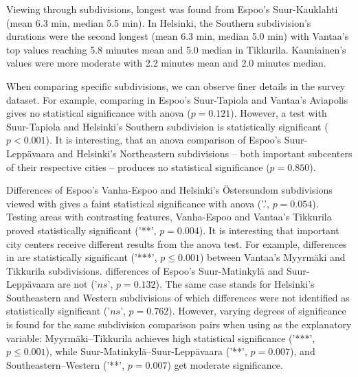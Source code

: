 Viewing  through subdivisions, longest  was found from Espoo's Suur-Kauklahti (mean 6.3 min, median 5.5 min). In Helsinki, the Southern subdivision's durations were the second longest (mean 6.3 min, median 5.0 min) with Vantaa's top values reaching 5.8 minutes mean and 5.0 median in Tikkurila. Kauniainen's  values were more moderate with 2.2 minutes mean and 2.0 minutes median.

When comparing specific subdivisions, we can observe finer details in the survey dataset. For example, comparing  in Espoo's Suur-Tapiola and Vantaa's Aviapolis gives no statistical significance with \acrshort{anova} ($p = 0.121$). However, a test with Suur-Tapiola and Helsinki's Southern subdivision is statistically significant ($p < 0.001$). It is interesting, that an \acrshort{anova}  comparison of Espoo's Suur-Leppävaara and Helsinki's Northeastern subdivisions -- both important subcenters of their respective cities -- produces no statistical significance ($p = 0.850$). 

Differences of Espoo's Vanha-Espoo and Helsinki's Östersundom subdivisions viewed with  gives a faint statistical significance with \acrshort{anova} ('.', $p = 0.054$). Testing areas with contrasting features, Vanha-Espoo and Vantaa's Tikkurila proved statistically significant ('**', $p = 0.004$). It is interesting that important city centers receive different results from the \acrshort{anova} test. For example, differences in  are statistically significant (’***’, $p \leq 0.001$) between Vantaa's Myyrmäki and Tikkurila subdivisions.  differences of Espoo's Suur-Matinkylä and Suur-Leppävaara are not ('$ns$', $p = 0.132$). The same case stands for Helsinki's Southeastern and Western subdivisions of which differences were not identified as statistically significant ('$ns$', $p = 0.762$). However, varying degrees of significance is found for the same subdivision comparison pairs when using  as the explanatory variable: Myyrmäki--Tikkurila achieves high statistical significance (’***’, $p \leq 0.001$), while Suur-Matinkylä--Suur-Leppävaara ('**', $p = 0.007$), and Southeastern--Western ('**', $p = 0.007$) get moderate significance.

